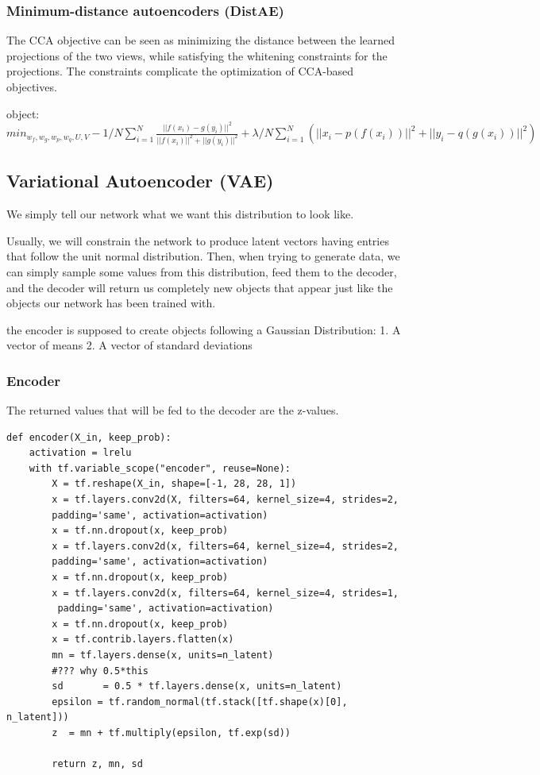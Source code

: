 \documentclass[a4paper]{article}
\begin{document}
\subsubsection{Minimum-distance autoencoders (DistAE)}

The CCA objective can be seen as minimizing the distance between the learned projections of the two views, while satisfying the whitening constraints for the projections. The constraints complicate the optimization of CCA-based objectives.

object:
$min_{w_f,w_g,w_p,w_q,U,V} -1/N \sum_{i=1}^N \frac{||f(x_i)-g(y_i)||^2}{||f(x_i)||^2+||g(y_i)||^2}+ \lambda/N \sum_{i=1}^N (||x_i - p(f(x_i))||^2 + ||y_i-q(g(x_i))||^2)$

\subsection{Variational Autoencoder (VAE)}
We simply tell our network what we want this distribution to look like.

Usually, we will constrain the network to produce latent vectors having entries that follow the unit normal distribution. Then, when trying to generate data, we can simply sample some values from this distribution, feed them to the decoder, and the decoder will return us completely new objects that appear just like the objects our network has been trained with.

the encoder is supposed to create objects following a Gaussian Distribution:
1. A vector of means
2. A vector of standard deviations

\subsubsection{Encoder}

The returned values that will be fed to the decoder are the z-values.
\begin{verbatim}
def encoder(X_in, keep_prob):
    activation = lrelu
    with tf.variable_scope("encoder", reuse=None):
        X = tf.reshape(X_in, shape=[-1, 28, 28, 1])
        x = tf.layers.conv2d(X, filters=64, kernel_size=4, strides=2, 
        padding='same', activation=activation)
        x = tf.nn.dropout(x, keep_prob)
        x = tf.layers.conv2d(x, filters=64, kernel_size=4, strides=2, 
        padding='same', activation=activation)
        x = tf.nn.dropout(x, keep_prob)
        x = tf.layers.conv2d(x, filters=64, kernel_size=4, strides=1,
         padding='same', activation=activation)
        x = tf.nn.dropout(x, keep_prob)
        x = tf.contrib.layers.flatten(x)
        mn = tf.layers.dense(x, units=n_latent)
        #??? why 0.5*this
        sd       = 0.5 * tf.layers.dense(x, units=n_latent)            
        epsilon = tf.random_normal(tf.stack([tf.shape(x)[0], n_latent])) 
        z  = mn + tf.multiply(epsilon, tf.exp(sd))
        
        return z, mn, sd
\end{verbatim}
\end{document}
